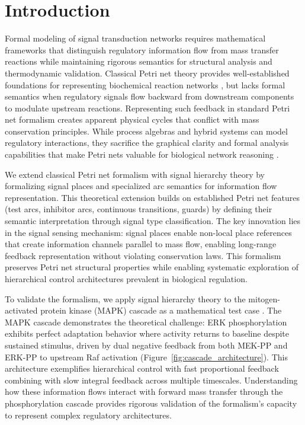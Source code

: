 \documentclass[twocolumn,11pt]{article}
\begin{document}
\section{Introduction}

Formal modeling of signal transduction networks requires mathematical frameworks that distinguish regulatory information flow from mass transfer reactions while maintaining rigorous semantics for structural analysis and thermodynamic validation. Classical Petri net theory provides well-established foundations for representing biochemical reaction networks \citep{reddy1993,chaouiya2007,heiner2008,koch2011}, but lacks formal semantics when regulatory signals flow backward from downstream components to modulate upstream reactions. Representing such feedback in standard Petri net formalism creates apparent physical cycles that conflict with mass conservation principles. While process algebras and hybrid systems can model regulatory interactions, they sacrifice the graphical clarity and formal analysis capabilities that make Petri nets valuable for biological network reasoning \citep{hardy2004,gilbert2006,reisig2013}.

We extend classical Petri net formalism \citep{reisig2013} with signal hierarchy theory by formalizing signal places and specialized arc semantics for information flow representation. This theoretical extension builds on established Petri net features (test arcs, inhibitor arcs, continuous transitions, guards) \citep{chaouiya2007} by defining their semantic interpretation through signal type classification. The key innovation lies in the signal sensing mechanism: signal places enable non-local place references that create information channels parallel to mass flow, enabling long-range feedback representation without violating conservation laws. This formalism preserves Petri net structural properties while enabling systematic exploration of hierarchical control architectures prevalent in biological regulation.

To validate the formalism, we apply signal hierarchy theory to the mitogen-activated protein kinase (MAPK) cascade as a mathematical test case \citep{cargnello2011,lavoie2020}. The MAPK cascade demonstrates the theoretical challenge: ERK phosphorylation exhibits perfect adaptation behavior where activity returns to baseline despite sustained stimulus, driven by dual negative feedback from both MEK-PP and ERK-PP to upstream Raf activation (Figure~\ref{fig:cascade_architecture}). This architecture exemplifies hierarchical control with fast proportional feedback combining with slow integral feedback across multiple timescales. Understanding how these information flows interact with forward mass transfer through the phosphorylation cascade provides rigorous validation of the formalism's capacity to represent complex regulatory architectures.
\end{document}
